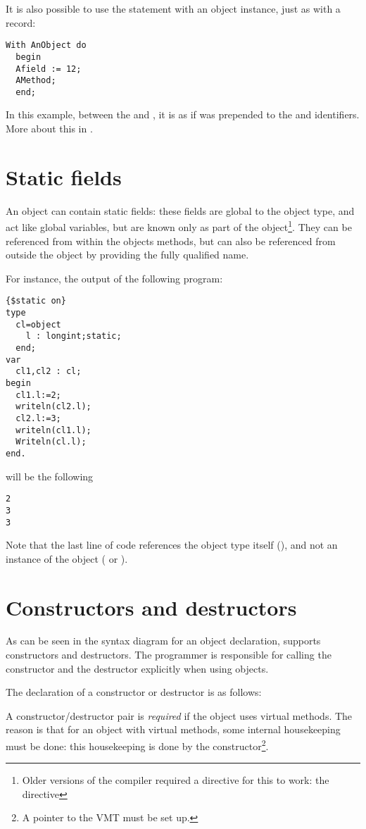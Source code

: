 It is also possible to use the  statement with an object instance,
just as with a record:
\begin{verbatim}
With AnObject do
  begin
  Afield := 12;
  AMethod;
  end;
\end{verbatim}
In this example, between the  and , it is as if
 was prepended to the  and 
identifiers. More about this in .

\section{Static fields}
An object can contain static fields: these fields are global to the object type, 
and act like global variables, but are known only as part of the
object\footnote{Older versions of the compiler required a directive for
this to work: the  directive}. They can be
referenced from within the objects methods, but can also be referenced from
outside the object by providing the fully qualified name.

For instance, the output of the following program:
\begin{verbatim}
{$static on}
type
  cl=object
    l : longint;static;
  end;
var
  cl1,cl2 : cl;
begin
  cl1.l:=2;
  writeln(cl2.l);
  cl2.l:=3;
  writeln(cl1.l);
  Writeln(cl.l);
end.
\end{verbatim}
will be the following
\begin{verbatim}
2
3
3
\end{verbatim}
Note that the last line of code references the object type itself (), 
and not an instance of the object ( or ).


\section{Constructors and destructors }
 
\label{se:constructdestruct}
As can be seen in the syntax diagram for an object declaration, \fpc supports
constructors and destructors. The programmer is responsible for calling the
constructor and the destructor explicitly when using objects.

The declaration of a constructor or destructor is as follows:

A constructor/destructor pair is {\em required} if the object uses virtual methods.
The reason is that for an object with virtual methods, some internal
housekeeping must be done: this housekeeping is done by the
constructor\footnote{A pointer to the VMT must be set up.}.

